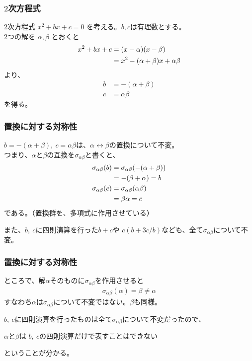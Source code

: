 \documentclass[12pt, t]{beamer}
\begin{document}
\begin{frame}
\frametitle{$2$次方程式}
$2$次方程式 $x^2 + bx + c = 0$ を考える。$b, c$は有理数とする。\\
$2$つの解を $\alpha, \beta$ とおくと
\begin{align}
  x^2 + bx + c &= (x - \alpha)(x - \beta) \notag \\
  &= x^2 -(\alpha + \beta)x + \alpha \beta
\end{align}
より、
\begin{align}
  b &= -(\alpha + \beta) \\
  c &= \alpha \beta
\end{align}
を得る。
\end{frame}

\begin{frame}
\frametitle{置換に対する対称性}
$b = -(\alpha + \beta),\ c = \alpha \beta$は、$\alpha \leftrightarrow \beta$の置換について不変。\\
つまり、$\alpha$と$\beta$の互換を$\sigma_{\alpha \beta}$と書くと、
\begin{align}
  \sigma_{\alpha \beta}(b) &= \sigma_{\alpha \beta} (-(\alpha + \beta)) \notag \\
                           &= -(\beta + \alpha) = b \\
  \sigma_{\alpha \beta}(c) &= \sigma_{\alpha \beta}(\alpha \beta) \notag \\
                           &= \beta \alpha = c
\end{align}
である。（置換群を、多項式に作用させている）

また、$b,\ c$に四則演算を行った$b + c$や $c (b + 3 c/b)$なども、全て$\sigma_{\alpha \beta}$について不変。
\end{frame}

\begin{frame}
\frametitle{置換に対する対称性}
ところで、解$\alpha$そのものに$\sigma_{\alpha \beta}$を作用させると
\begin{align}
  \sigma_{\alpha \beta}(\alpha) = \beta \neq \alpha
\end{align}
すなわち$\alpha$は$\sigma_{\alpha \beta}$について不変ではない。$\beta$も同様。

$b,\ c$に四則演算を行ったものは全て$\sigma_{\alpha \beta}$について不変だったので、
\begin{center}
$\alpha$と$\beta$は $b,\ c$の四則演算だけで表すことはできない
\end{center}
ということが分かる。
\end{frame}
\end{document}
